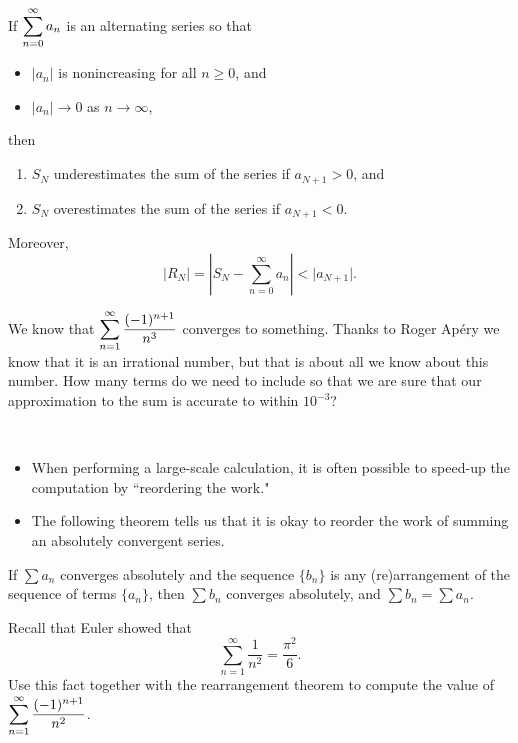 \begin{theorem}
If $\displaystyle\sum_{n=0}^\infty a_n$ is an alternating series so that
\begin{itemize}
\item $|a_n|$ is nonincreasing for all $n\ge 0$, and
\item $|a_n|\to 0$ as $n\to\infty$,
\end{itemize}
then
\begin{enumerate}
\item $S_N$ underestimates the sum of the series if $a_{N+1}>0$, and
\item $S_N$ overestimates the sum of the series if $a_{N+1}<0$.
\end{enumerate}
Moreover, 
\begin{equation*}
\Big| R_N \Big| = \left| S_N - \sum_{n=0}^\infty a_n\right| < \Big| a_{N+1}\Big|.
\end{equation*}
\end{theorem}

\begin{example}
We know that $\displaystyle\sum_{n=1}^\infty\frac{(-1)^{n+1}}{n^3}$ converges to something.
Thanks to Roger Ap\'ery we know that it is an irrational number, but that is about all we know about this number.
How many terms do we need to include so that we are sure that our approximation to the sum is accurate to within $10^{-3}$?
\end{example}

\newpage

\begin{remark}\,
\begin{itemize}
\item When performing a large-scale calculation, it is often possible to speed-up the computation by ``reordering the work."
\item The following theorem tells us that it is okay to reorder the work of summing an absolutely convergent series.
\end{itemize}
\end{remark}

\begin{theorem}
If $\sum a_n$ converges absolutely and the sequence $\{b_n\}$ is any (re)arrangement of the sequence of terms $\{a_n\}$, then $\sum b_n$ converges absolutely, and $\sum b_n = \sum a_n$.
\end{theorem}

\begin{example}
Recall that Euler showed that
\begin{equation*}
\sum_{n=1}^\infty\frac{1}{n^2} = \frac{\pi^2}{6}.
\end{equation*}
Use this fact together with the rearrangement theorem to compute the value of $\displaystyle\sum_{n=1}^\infty\frac{(-1)^{n+1}}{n^2}$.
\end{example}

